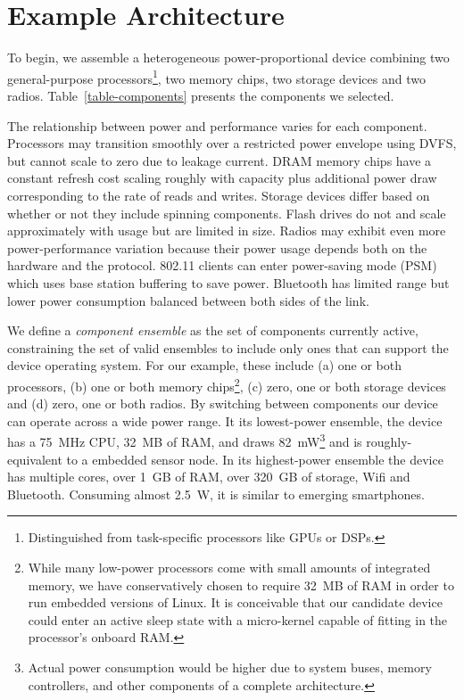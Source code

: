 \section{Example Architecture}
\label{section-architecture}



To begin, we assemble a heterogeneous power-proportional device combining two
general-purpose processors\footnote{Distinguished from task-specific
processors like GPUs or DSPs.}, two memory chips, two storage devices and two
radios. Table~\ref{table-components} presents the components we selected.

The relationship between power and performance varies for each component.
Processors may transition smoothly over a restricted power envelope using
DVFS, but cannot scale to zero due to leakage current. DRAM memory 
chips have a
constant refresh cost scaling roughly with capacity plus additional power draw
corresponding to the rate of reads and writes. Storage devices differ based on whether or not they include
spinning components. Flash drives do not and scale approximately with usage
but are limited in size. Radios may exhibit even more power-performance
variation because their power usage depends both on the hardware and the
protocol. 802.11 clients can enter power-saving mode (PSM) which uses base
station buffering to save power. Bluetooth has limited range but lower power
consumption balanced between both sides of the link.

We define a \textit{component ensemble} as the set of components currently
active, constraining the set of valid ensembles to include only ones that can
support the device operating system. For our example, these include (a) one
or both processors, (b) one or both memory chips\footnote{While many
low-power processors come with small amounts of integrated memory, we have
conservatively chosen to require 32~MB of RAM in order to run embedded
versions of Linux. It is conceivable that our candidate device could enter an
active sleep state with a micro-kernel capable of fitting in the processor's
onboard RAM.}, (c) zero, one or both storage devices and (d) zero, one or
both radios. By switching between components our device can operate across a
wide power range. It its lowest-power ensemble, the device has a 75~MHz CPU,
32~MB of RAM, and draws 82~mW\footnote{Actual power consumption would be
higher due to system buses, memory controllers, and other components of a
complete architecture.} and is roughly-equivalent to a embedded sensor node.
In its highest-power ensemble the device has multiple cores, over 1~GB of
RAM, over 320~GB of storage, Wifi and Bluetooth. Consuming almost 2.5~W, it
is similar to emerging smartphones.

